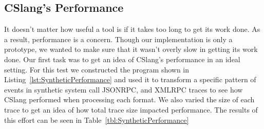%
%
%
%


\subsection{CSlang's Performance}

It doesn't matter how useful a tool is if it takes too long to get its work
done.  As a result, performance is a concern.  Though our implementation is
only a prototype, we wanted to make sure that it wasn't overly slow in
getting its work done.  Our first task was to get an idea of CSlang's
performance in an ideal setting.  For this test we constructed the program
shown in Listing~\ref{lst:SyntheticPerformance}
and used it to transform a specific
pattern of events in synthetic system call JSONRPC, and XMLRPC traces to
see how CSlang performed when processing each format.  We also varied the
size of each trace to get an idea of how total trace size impacted
performance.  The results of this effort can be seen in
Table~\ref{tbl:SyntheticPerformance}

